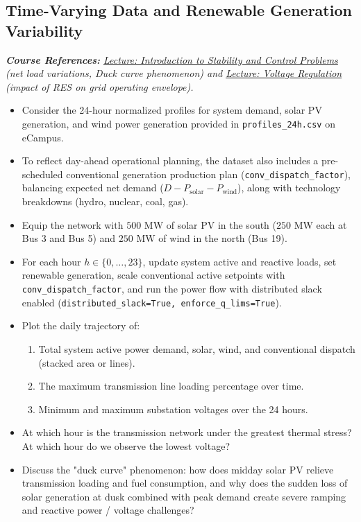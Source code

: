 \documentclass[11pt]{article}
\begin{document}
  \subsection{Time-Varying Data and Renewable Generation Variability}
  \noindent\textit{\textbf{Course References:} \href{https://github.com/bcornelusse/ELEC0447-analysis-power-systems/blob/master/Lectures/intro_stability/intro_stability.pdf}{Lecture: Introduction to Stability and Control Problems} (net load variations, Duck curve phenomenon) and \href{https://github.com/bcornelusse/ELEC0447-analysis-power-systems/blob/master/Lectures/voltage_stability/voltage_stability.pdf}{Lecture: Voltage Regulation} (impact of RES on grid operating envelope).}
  \vspace{1mm}
  \begin{itemize}
    \item Consider the 24-hour normalized profiles for system demand, solar PV generation, and wind power generation provided in \lstinline|profiles_24h.csv| on eCampus.
    \item To reflect day-ahead operational planning, the dataset also includes a pre-scheduled conventional generation production plan (\lstinline|conv_dispatch_factor|), balancing expected net demand ($D - P_{\text{solar}} - P_{\text{wind}}$), along with technology breakdowns (hydro, nuclear, coal, gas).
    \item Equip the network with $500\text{ MW}$ of solar PV in the south ($250\text{ MW}$ each at Bus 3 and Bus 5) and $250\text{ MW}$ of wind in the north (Bus 19).
    \item For each hour $h \in \{0, \dots, 23\}$, update system active and reactive loads, set renewable generation, scale conventional active setpoints with \lstinline|conv_dispatch_factor|, and run the power flow with distributed slack enabled (\lstinline|distributed_slack=True, enforce_q_lims=True|).
    \item Plot the daily trajectory of:
    \begin{enumerate}
      \item Total system active power demand, solar, wind, and conventional dispatch (stacked area or lines).
      \item The maximum transmission line loading percentage over time.
      \item Minimum and maximum substation voltages over the 24 hours.
    \end{enumerate}
    \item At which hour is the transmission network under the greatest thermal stress? At which hour do we observe the lowest voltage?
    \item Discuss the "duck curve" phenomenon: how does midday solar PV relieve transmission loading and fuel consumption, and why does the sudden loss of solar generation at dusk combined with peak demand create severe ramping and reactive power / voltage challenges?
  \end{itemize}
\end{document}
